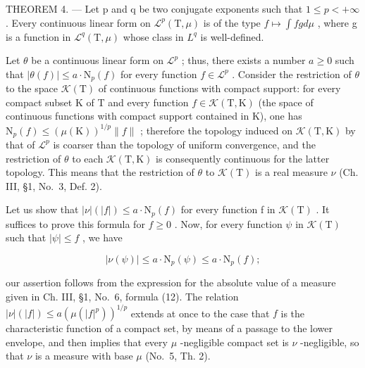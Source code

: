 THEOREM 4. --- Let p and q be two conjugate exponents such that \(1 \leqslant p < +\infty\) . Every continuous linear form on \(\mathcal{L}^{p}(\mathrm{T}, \mu)\) is of the type \(f \mapsto \int fg d\mu\) , where g is a function in \(\mathcal{L}^{q}(\mathrm{T}, \mu)\) whose class in \(L^{q}\) is well-defined.

Let \(\theta\) be a continuous linear form on \(\mathcal{L}^p\) ; thus, there exists a number \(a \geqslant 0\) such that \(|\theta(f)| \leqslant a \cdot \mathrm{N}_p(f)\) for every function \(f \in \mathcal{L}^p\) . Consider the restriction of \(\theta\) to the space \(\mathcal{K}(\mathrm{T})\) of continuous functions with compact support: for every compact subset K of T and every function \(f \in \mathcal{K}(\mathrm{T}, \mathrm{K})\) (the space of continuous functions with compact support contained in K), one has \(\mathrm{N}_p(f) \leqslant (\mu(\mathrm{K}))^{1/p} \| f \|\) ; therefore the topology induced on \(\mathcal{K}(\mathrm{T}, \mathrm{K})\) by that of \(\mathcal{L}^p\) is coarser than the topology of uniform convergence, and the restriction of \(\theta\) to each \(\mathcal{K}(\mathrm{T}, \mathrm{K})\) is consequently continuous for the latter topology. This means that the restriction of \(\theta\) to \(\mathcal{K}(\mathrm{T})\) is a real measure \(\nu\) (Ch. III, §1, No.~3, Def. 2).

Let us show that \(|\nu|(|f|) \leqslant a \cdot \mathrm{N}_{p}(f)\) for every function f in \(\mathcal{K}(\mathrm{T})\) . It suffices to prove this formula for \(f \geqslant 0\) . Now, for every function \(\psi\) in \(\mathcal{K}(\mathrm{T})\) such that \(|\psi| \leqslant f\) , we have

\[
| \nu (\psi) | \leqslant a \cdot \mathrm{N} _ {p} (\psi) \leqslant a \cdot \mathrm{N} _ {p} (f);
\]

our assertion follows from the expression for the absolute value of a measure given in Ch. III, §1, No.~6, formula (12). The relation \(|\nu|(|f|) \leqslant a(\mu(|f|^p))^{1/p}\) extends at once to the case that \(f\) is the characteristic function of a compact set, by means of a passage to the lower envelope, and then implies that every \(\mu\) -negligible compact set is \(\nu\) -negligible, so that \(\nu\) is a measure with base \(\mu\) (No.~5, Th. 2).

